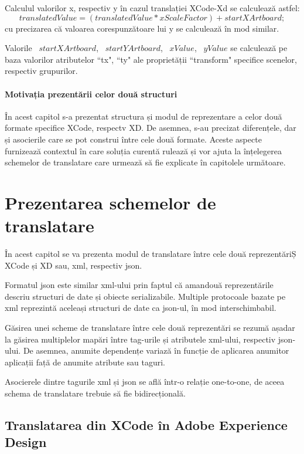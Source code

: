 Calculul valorilor x, respectiv y în cazul translației XCode-Xd se calculează astfel:
        \[ translatedValue = (translatedValue * xScaleFactor) + startXArtboard; \]
cu precizarea că valoarea corespunzătoare lui y se calculează în mod similar.

Valorile ~$startXArtboard$, ~$startYArtboard$, ~$xValue$, ~$yValue$ se calculează pe baza valorilor atributelor ``tx", ``ty" ale proprietății ``transform" specifice scenelor, respectiv grupurilor.

\subsubsection {Motivația prezentării celor două structuri} 

În acest capitol s-a prezentat structura și modul de reprezentare a celor două formate specifice XCode, respectv XD. De asemnea, s-au precizat diferențele, dar și asocierile care se pot construi între cele două formate. Aceste aspecte furnizează contextul în care soluția curentă rulează și vor ajuta la înțelegerea schemelor de translatare care urmează să fie explicate în capitolele următoare.

\chapter{Prezentarea schemelor de translatare}

În acest capitol se va prezenta modul de translatare între cele două reprezentăriȘ XCode și XD sau, xml, respectiv json. 

Formatul json este similar xml-ului prin faptul că amandouă reprezentările descriu structuri de date și obiecte serializabile. Multiple protocoale bazate pe xml reprezintă aceleași structuri de date ca json-ul, în mod interschimbabil.

Găsirea unei scheme de translatare între cele două reprezentări se rezumă așadar la găsirea multiplelor mapări între tag-urile și atributele xml-ului, respectiv json-ului. De asemnea, anumite dependențe variază în funcție de aplicarea anumitor aplicații față de anumite atribute sau taguri.

Asocierele dintre tagurile xml și json se află într-o relație one-to-one, de aceea schema de translatare trebuie să fie bidirecțională.

\section{Translatarea din XCode în Adobe Experience Design}

